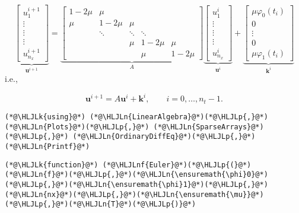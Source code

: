 \documentclass[12pt,landscape]{article}
\newcommand{\HLJLk}[1]{\textcolor[RGB]{148,91,176}{\textbf{#1}}}
\newcommand{\HLJLn}[1]{#1}
\newcommand{\HLJLnf}[1]{\textcolor[RGB]{66,102,213}{#1}}
\newcommand{\HLJLp}[1]{#1}
\begin{document}
{\[
\underbrace{\begin{bmatrix}
u^{i+1}_{1} \\
\vdots \\
\vdots \\
\vdots \\
u^{i+1}_{n_x}
\end{bmatrix}}_{\mathbf{u}^{i+1}} = 
\underbrace{\begin{bmatrix}
1 - 2\mu & \mu & & & \\
\mu  & 1-2\mu & \mu  & & \\
      & \ddots & \ddots & \ddots & \\
      &        & \mu    & 1- 2\mu & \mu \\
      &        &        &\mu      & 1-2\mu
\end{bmatrix}}_{A}
\underbrace{\begin{bmatrix}
u^{i}_{1} \\
\vdots \\
\vdots \\
\vdots \\
u^{i}_{n_x}
\end{bmatrix}}_{\mathbf{u}^i}
+
\underbrace{\begin{bmatrix}
\mu\varphi_0(t_i) \\
0 \\
\vdots \\
0 \\
\mu \varphi_1(t_i)
\end{bmatrix}}_{\mathbf{k}^i}
\]
i.e., 

\[
\mathbf{u}^{i+1} = A\mathbf{u}^i + \mathbf{k}^i, \qquad i = 0, \ldots, n_t-1.
\]

\begin{lstlisting}
(*@\HLJLk{using}@*) (*@\HLJLn{LinearAlgebra}@*)(*@\HLJLp{,}@*) (*@\HLJLn{Plots}@*)(*@\HLJLp{,}@*) (*@\HLJLn{SparseArrays}@*)(*@\HLJLp{,}@*) (*@\HLJLn{OrdinaryDiffEq}@*)(*@\HLJLp{,}@*) (*@\HLJLn{Printf}@*)
\end{lstlisting}


\begin{lstlisting}
(*@\HLJLk{function}@*) (*@\HLJLnf{Euler}@*)(*@\HLJLp{(}@*)(*@\HLJLn{f}@*)(*@\HLJLp{,}@*)(*@\HLJLn{\ensuremath{\phi}0}@*)(*@\HLJLp{,}@*)(*@\HLJLn{\ensuremath{\phi}1}@*)(*@\HLJLp{,}@*)(*@\HLJLn{nx}@*)(*@\HLJLp{,}@*)(*@\HLJLn{\ensuremath{\mu}}@*)(*@\HLJLp{,}@*)(*@\HLJLn{T}@*)(*@\HLJLp{)}@*)
    

\end{lstlisting}}
\end{document}
